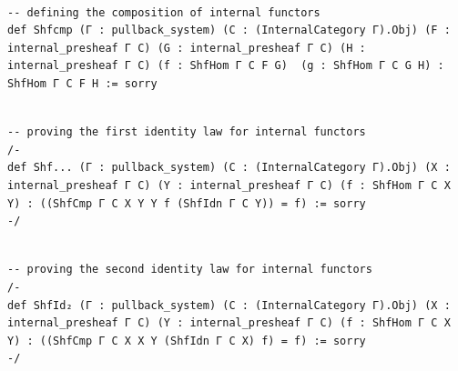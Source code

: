 \documentclass{book}
\theoremstyle{definition}
\newcounter{lcounter}
\begin{document}
\begin{center}
\begin{tcolorbox}[width=5in,colback={white},title={\begin{center}\texttt{Lean \thelcounter} \addtocounter{lcounter}{1}  \end{center}},colbacktitle=Blue,coltitle=black]
\begin{verbatim}

-- defining the composition of internal functors
def Shfcmp (Γ : pullback_system) (C : (InternalCategory Γ).Obj) (F : internal_presheaf Γ C) (G : internal_presheaf Γ C) (H : internal_presheaf Γ C) (f : ShfHom Γ C F G)  (g : ShfHom Γ C G H) : ShfHom Γ C F H := sorry

\end{verbatim}
\end{tcolorbox}
\end{center}

\begin{center}
\begin{tcolorbox}[width=5in,colback={white},title={\begin{center}\texttt{Lean \thelcounter} \addtocounter{lcounter}{1}  \end{center}},colbacktitle=Blue,coltitle=black]
\begin{verbatim}

-- proving the first identity law for internal functors
/-
def Shf... (Γ : pullback_system) (C : (InternalCategory Γ).Obj) (X : internal_presheaf Γ C) (Y : internal_presheaf Γ C) (f : ShfHom Γ C X Y) : ((ShfCmp Γ C X Y Y f (ShfIdn Γ C Y)) = f) := sorry
-/

\end{verbatim}
\end{tcolorbox}
\end{center}

\begin{center}
\begin{tcolorbox}[width=5in,colback={white},title={\begin{center}\texttt{Lean \thelcounter} \addtocounter{lcounter}{1}  \end{center}},colbacktitle=Blue,coltitle=black]
\begin{verbatim}

-- proving the second identity law for internal functors
/-
def ShfId₂ (Γ : pullback_system) (C : (InternalCategory Γ).Obj) (X : internal_presheaf Γ C) (Y : internal_presheaf Γ C) (f : ShfHom Γ C X Y) : ((ShfCmp Γ C X X Y (ShfIdn Γ C X) f) = f) := sorry
-/

\end{verbatim}
\end{tcolorbox}
\end{center}
\end{document}
